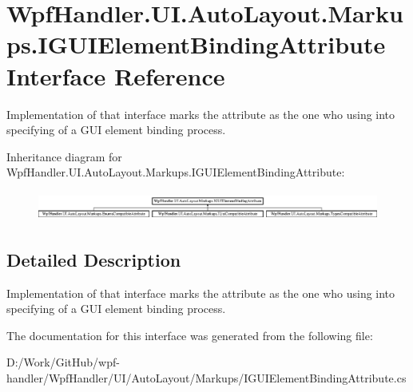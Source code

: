 \hypertarget{interface_wpf_handler_1_1_u_i_1_1_auto_layout_1_1_markups_1_1_i_g_u_i_element_binding_attribute}{}\section{Wpf\+Handler.\+U\+I.\+Auto\+Layout.\+Markups.\+I\+G\+U\+I\+Element\+Binding\+Attribute Interface Reference}
\label{interface_wpf_handler_1_1_u_i_1_1_auto_layout_1_1_markups_1_1_i_g_u_i_element_binding_attribute}


Implementation of that interface marks the attribute as the one who using into specifying of a G\+UI element binding process.  


Inheritance diagram for Wpf\+Handler.\+U\+I.\+Auto\+Layout.\+Markups.\+I\+G\+U\+I\+Element\+Binding\+Attribute\+:\begin{figure}[H]
\begin{center}
\leavevmode
\includegraphics[height=0.974761cm]{d4/d32/interface_wpf_handler_1_1_u_i_1_1_auto_layout_1_1_markups_1_1_i_g_u_i_element_binding_attribute}
\end{center}
\end{figure}


\subsection{Detailed Description}
Implementation of that interface marks the attribute as the one who using into specifying of a G\+UI element binding process. 



The documentation for this interface was generated from the following file\+:\begin{DoxyCompactItemize}
\item 
D\+:/\+Work/\+Git\+Hub/wpf-\/handler/\+Wpf\+Handler/\+U\+I/\+Auto\+Layout/\+Markups/I\+G\+U\+I\+Element\+Binding\+Attribute.\+cs\end{DoxyCompactItemize}
